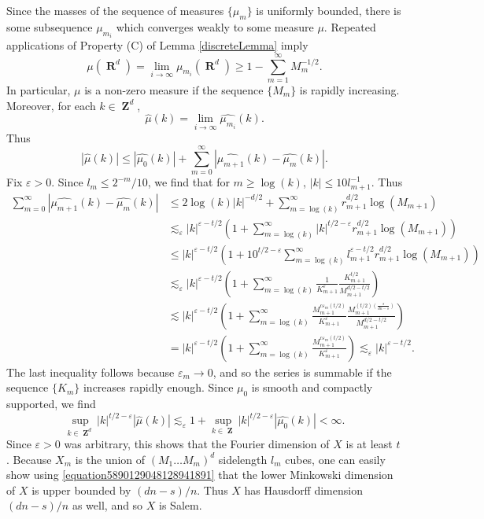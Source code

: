 \documentclass[12pt,reqno]{article}
\numberwithin{equation}{section}
\DeclareMathOperator{\RR}{\mathbf{R}}
\DeclareMathOperator{\ZZ}{\mathbf{Z}}
\begin{document}
Since the masses of the sequence of measures $\{ \mu_m \}$ is uniformly bounded, there is some subsequence $\mu_{m_i}$ which converges weakly to some measure $\mu$. Repeated applications of Property (C) of Lemma \ref{discreteLemma} imply
%
\[ \mu(\RR^d) = \lim_{i \to \infty} \mu_{m_i}(\RR^d) \geq 1 - \sum_{m=1}^\infty M_m^{-1/2}. \]
%
In particular, $\mu$ is a non-zero measure if the sequence $\{ M_m \}$ is rapidly increasing. Moreover, for each $k \in \ZZ^d$,
%
\[ \widehat{\mu}(k) = \lim_{i \to \infty} \widehat{\mu_{m_i}}(k). \]
%
Thus
%
\[ |\widehat{\mu}(k)| \leq |\widehat{\mu_0}(k)| + \sum_{m = 0}^\infty |\widehat{\mu_{m+1}}(k) - \widehat{\mu_m}(k)|. \]
%
Fix $\varepsilon > 0$. Since $l_m \leq 2^{-m}/10$, we find that for $m \geq \log(k)$, $|k| \leq 10 l_{m+1}^{-1}$. Thus
%
\begin{align*}
    \sum_{m = 0}^\infty |\widehat{\mu_{m+1}}(k) - \widehat{\mu_m}(k)| &\leq 2 \log(k) |k|^{-d/2} + \sum_{m = \log(k)}^\infty r_{m+1}^{d/2} \log(M_{m+1})\\
    &\lesssim_\varepsilon |k|^{\varepsilon- t/2} \left( 1 + \sum_{m = \log(k)}^\infty |k|^{t/2-\varepsilon} r_{m+1}^{d/2} \log(M_{m+1}) \right)\\
    &\leq |k|^{\varepsilon - t/2} \left( 1 + 10^{t/2 - \varepsilon} \sum_{m = \log(k)}^\infty l_{m+1}^{\varepsilon - t/2} r_{m+1}^{d/2} \log(M_{m+1}) \right)\\
    &\lesssim_\varepsilon |k|^{\varepsilon - t/2} \left( 1 + \sum_{m = \log(k)}^\infty \frac{1}{K_{m+1}^{\varepsilon}} \frac{K_{m+1}^{t/2}}{M_{m+1}^{d/2 - t/2}} \right)\\
    &\lesssim |k|^{\varepsilon - t/2} \left( 1 + \sum_{m = \log(k)}^\infty \frac{M_{m+1}^{c\varepsilon_m (t/2)}}{K_{m+1}^\varepsilon} \frac{M_{m+1}^{(t/2) \left( \frac{s}{dn-s} \right)}}{M_{m+1}^{d/2 - t/2}} \right)\\
    &= |k|^{\varepsilon - t/2} \left( 1 + \sum_{m = \log(k)}^\infty \frac{M_{m+1}^{c\varepsilon_m (t/2)}}{K_{m+1}^{\varepsilon}} \right) \lesssim_\varepsilon |k|^{\varepsilon - t/2}.
\end{align*}
%
The last inequality follows because $\varepsilon_m \to 0$, and so the series is summable if the sequence $\{ K_m \}$ increases rapidly enough. Since $\mu_0$ is smooth and compactly supported, we find
%
\[ \sup_{k \in \ZZ^d} |k|^{t/2 - \varepsilon} |\widehat{\mu}(k)| \lesssim_\varepsilon 1 + \sup_{k \in \ZZ} |k|^{t/2 - \varepsilon} |\widehat{\mu_0}(k)| < \infty. \]
%
Since $\varepsilon > 0$ was arbitrary, this shows that the Fourier dimension of $X$ is at least $t$. Because $X_m$ is the union of $(M_1 \dots M_m)^d$ sidelength $l_m$ cubes, one can easily show using \eqref{equation5890129048128941891} that the lower Minkowski dimension of $X$ is upper bounded by $(dn - s)/n$. Thus $X$ has Hausdorff dimension $(dn - s)/n$ as well, and so $X$ is Salem.
\end{document}
